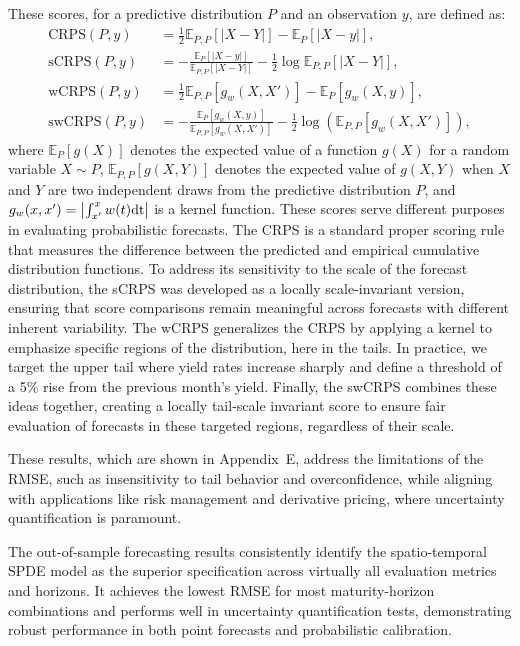 \documentclass[
  12pt]{article}
\begin{document}
These scores, for a predictive distribution \( P \) and an observation \( y \), are defined as:
\begin{align*}
    \text{CRPS}(P, y) &= \frac{1}{2} \mathbb{E}_{P,P} [ |X - Y| ] - \mathbb{E}_{P} [ |X - y| ], \\
    \text{sCRPS}(P, y) &= - \frac{\mathbb{E}_{P} [ |X - y| ]}{\mathbb{E}_{P,P} [ |X - Y| ]}
    - \frac{1}{2} \log \mathbb{E}_{P,P} [ |X - Y| ], \\
    \text{wCRPS}(P, y) &= \frac{1}{2} \mathbb{E}_{P,P}\left[g_w(X, X')\right] - \mathbb{E}_{P}\left[g_w(X, y)\right], \\
    \text{swCRPS}(P, y) &= -\frac{\mathbb{E}_{P}\left[g_w(X, y)\right]}{\mathbb{E}_{P,P}\left[g_w(X, X')\right]} - \frac{1}{2} \log\left(\mathbb{E}_{P,P}\left[g_w(X, X')\right]\right),
\end{align*}
where \( \mathbb{E}_{P} [g(X)] \) denotes the expected value of a function \( g(X) \) for a random variable $X \sim P$, \( \mathbb{E}_{P,P} [g(X,Y)]\) denotes the expected value of $g(X,Y)$ when $X$ and $Y$ are two independent draws from the predictive distribution $P$, and \(g_w(x, x') = \left|\int_{x'}^{x} w(t) \rm{d}t\right| \) is a kernel function. These scores serve different purposes in evaluating probabilistic forecasts. The CRPS is a standard proper scoring rule that measures the difference between the predicted and empirical cumulative distribution functions. To address its sensitivity to the scale of the forecast distribution, the sCRPS was developed as a locally scale-invariant version, ensuring that score comparisons remain meaningful across forecasts with different inherent variability. The wCRPS generalizes the CRPS by applying a kernel to emphasize specific regions of the distribution, here in the tails. In practice, we target the upper tail where yield rates increase sharply and define a threshold of a 5\% rise from the previous month's yield. Finally, the swCRPS combines these ideas together, creating a locally tail-scale invariant score to ensure fair evaluation of forecasts in these targeted regions, regardless of their scale.

These results, which are shown in Appendix~E, address the limitations of the RMSE, such as insensitivity to tail behavior and overconfidence, while aligning with applications like risk management and derivative pricing, where uncertainty quantification is paramount. 

The out-of-sample forecasting results consistently identify the spatio-temporal SPDE model as the superior specification across virtually all evaluation metrics and horizons. It achieves the lowest RMSE for most maturity-horizon combinations and performs well in uncertainty quantification tests, demonstrating robust performance in both point forecasts and probabilistic calibration.
\end{document}

